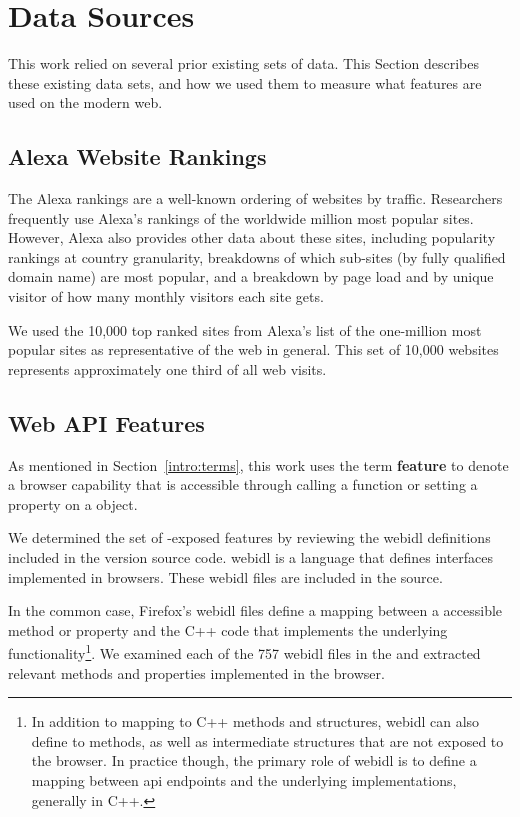 \section{Data Sources}
\label{measurement:data-sources}

This work relied on several prior existing sets of data.  This Section
describes these existing data sets, and how we used them to measure what
\JS features are used on the modern web.


\subsection{Alexa Website Rankings}
\label{measurement:data-sources:website-popularity-rankings}
The Alexa rankings are a well-known ordering of websites by traffic.
Researchers frequently use Alexa's rankings of the worldwide million most
popular sites. However, Alexa also provides other data about these sites,
including popularity rankings at country granularity, breakdowns of which
sub-sites (by fully qualified domain name) are most popular, and a breakdown by
page load and by unique visitor of how many monthly visitors each site gets.

We used the 10,000 top ranked sites from Alexa's list of the one-million
most popular sites as representative of the web in general.  This set of 10,000
websites represents approximately one third of all web visits.


\subsection{Web API Features}
\label{measurement:data-sources:method-web-features}
As mentioned in Section~\ref{intro:terms}, this work uses the term
\textbf{feature} to denote a browser capability that is accessible through
calling a \JS function or setting a property on a \JS object.

We determined the set of \JS-exposed features by reviewing the \gls{webidl}
definitions included in the \FF version \FFversion source code. \gls{webidl} is
a language that defines \JS interfaces implemented in browsers.
These \gls{webidl} files are included in the \FF source.

In the common case, Firefox's \gls{webidl} files define a mapping between a
\JS accessible method or property and the C++ code that implements
the underlying functionality\footnote{In addition to mapping
\JS to C++ methods and structures, \gls{webidl} can also define \JS
to \JS methods, as well as intermediate structures that are not
exposed to the browser.  In practice though, the primary role of \gls{webidl}
is to define a mapping between \JS \gls{api} endpoints and
the underlying implementations, generally in C++.}. We examined each of the 757
\gls{webidl} files in the \FF and extracted \numfeatures relevant methods and
properties implemented in the browser.


